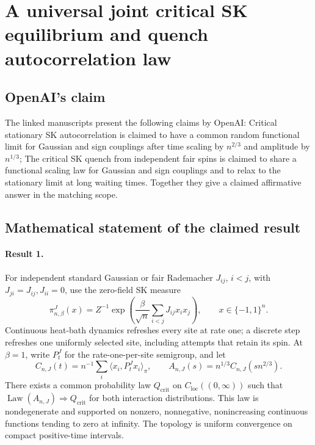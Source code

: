 \documentclass[11pt]{article}
\begin{document}
\section*{A universal joint critical SK equilibrium and quench autocorrelation law}

\subsection{OpenAI's claim}
The linked manuscripts present the following claims by OpenAI: Critical stationary SK autocorrelation is claimed to have a common random functional limit for Gaussian and sign couplings after time scaling by $n^{2/3}$ and amplitude by $n^{1/3}$; The critical SK quench from independent fair spins is claimed to share a functional scaling law for Gaussian and sign couplings and to relax to the stationary limit at long waiting times. Together they give a claimed affirmative answer in the matching scope.

\subsection{Mathematical statement of the claimed result}
\paragraph{Result 1.} For independent standard Gaussian or fair Rademacher $J_{ij}$, $i<j$, with $J_{ji}=J_{ij},J_{ii}=0$, use the zero-field SK measure
\[
 \pi_{n,\beta}^J(x)=Z^{-1}\exp\left(\frac\beta{\sqrt n}\sum_{i<j}J_{ij}x_ix_j\right),\qquad x\in\{-1,1\}^n.
\]
Continuous heat-bath dynamics refreshes every site at rate one; a discrete step refreshes one uniformly selected site, including attempts that retain its spin. At $\beta=1$, write $P_t^J$ for the rate-one-per-site semigroup, and let
\[
 C_{n,J}(t)=n^{-1}\sum_i\langle x_i,P_t^Jx_i\rangle_\pi,\qquad
 A_{n,J}(s)=n^{1/3}C_{n,J}(sn^{2/3}).
\]
There exists a common probability law $Q_{\mathrm{crit}}$ on $C_{\mathrm{loc}}((0,\infty))$ such that $\operatorname{Law}(A_{n,J})\Longrightarrow Q_{\mathrm{crit}}$ for both interaction distributions. This law is nondegenerate and supported on nonzero, nonnegative, nonincreasing continuous functions tending to zero at infinity. The topology is uniform convergence on compact positive-time intervals.
\end{document}
